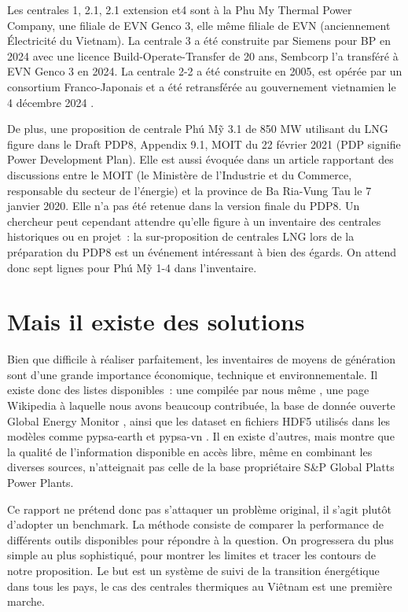 \documentclass[a4paper,11pt]{report}
\begin{document}
Les centrales 1, 2.1, 2.1 extension et4 sont à la Phu My Thermal Power Company, une filiale de EVN Genco 3, elle même filiale de EVN (anciennement Électricité du Vietnam). La centrale 3 a été construite par Siemens pour BP en 2024 avec une licence Build-Operate-Transfer de 20 ans, Sembcorp l'a transféré à EVN Genco 3 en 2024. La centrale 2-2 a été construite en 2005, est opérée par un consortium Franco-Japonais et a été retransférée au gouvernement vietnamien le 4 décembre 2024 \citep{UAWJD84R}.

De plus, une proposition de centrale Phú Mỹ 3.1 de 850 MW utilisant du LNG figure dans le Draft PDP8, Appendix 9.1, MOIT du 22 février 2021 (PDP signifie Power Development Plan). Elle est aussi évoquée dans un article rapportant des discussions entre le MOIT (le Ministère de l'Industrie et du Commerce, responsable du secteur de l'énergie) et la province de Ba Ria-Vung Tau le 7 janvier 2020. Elle n'a pas été retenue dans la version finale du PDP8. Un chercheur peut cependant attendre qu'elle figure à un inventaire des centrales historiques ou en projet~: la sur-proposition de centrales LNG lors de la préparation du PDP8 est un événement intéressant à bien des égards. On attend donc sept lignes pour Phú Mỹ 1-4 dans l'inventaire.

\section{Mais il existe des solutions}

Bien que difficile à réaliser parfaitement, les inventaires de moyens de génération sont d'une grande importance économique, technique et environnementale. Il existe donc des listes disponibles~: une compilée par nous même \citep{NLN8GPNI}, une page Wikipedia \citep{TQ8TFB8H} à laquelle nous avons beaucoup contribuée, la base de donnée ouverte Global Energy Monitor \citep{LCVI7NAT}, ainsi que les dataset en fichiers HDF5 utilisés dans les modèles comme pypsa-earth \citep{UMGUESAZ} et pypsa-vn \citep{VGASHFPT}. Il en existe d'autres, mais \citep{LYGDCQCL} montre que la qualité de l'information disponible en accès libre, même en combinant les diverses sources, n'atteignait pas celle de la base propriétaire S\&P Global Platts Power Plants.

Ce rapport ne prétend donc pas s'attaquer un problème original, il s'agit plutôt d'adopter un benchmark. La méthode consiste de comparer la performance de différents outils disponibles pour répondre à la question. On progressera du plus simple au plus sophistiqué, pour montrer les limites et tracer les contours de notre proposition. Le but est un système de suivi de la transition énergétique dans tous les pays, le cas des centrales thermiques au Viêtnam est une première marche.
\end{document}
